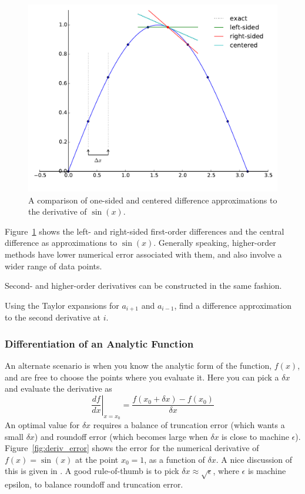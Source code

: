 \begin{figure}[t]
\centering
\includegraphics[width=0.8\linewidth]{derivs}
\caption[Difference approximations to the derivative of $\sin(x)$]
        {\label{fig:derivs} A comparison of one-sided and centered
          difference approximations to the derivative of $\sin(x)$.}
\end{figure}

Figure~\ref{fig:derivs} shows the left- and right-sided first-order
differences and the central difference as approximations to
$\sin(x)$. Generally speaking, higher-order methods have lower
numerical error associated with them, and also involve a wider range
of data points.

Second- and higher-order derivatives can be constructed in the same fashion.

\begin{exercise}
{Using the Taylor expansions for $a_{i+1}$ and $a_{i-1}$, find a difference
approximation to the second derivative at $i$.}
\end{exercise}

\subsubsection{Differentiation of an Analytic Function}

An alternate scenario is when you know the analytic form of the
function, $f(x)$, and are free to choose the points where you evaluate
it.  Here you can pick a $\delta x$ and evaluate the derivative as
\begin{equation}
\left . \frac{df}{dx} \right |_{x=x_0} =  \frac{f(x_0+\delta x) - f(x_0)}{\delta x}
\end{equation}
An optimal value for $\delta x$ requires a balance of truncation error
(which wants a small $\delta x$) and roundoff error (which becomes
large when $\delta x$ is close to machine $\epsilon$).
Figure~\ref{fig:deriv_error} shows the error for the numerical
derivative of $f(x) = \sin(x)$ at the point $x_0 = 1$, as a function
of $\delta x$.  A nice discussion of this is given in \cite{yak}.  A
good rule-of-thumb is to pick $\delta x \approx \sqrt{\epsilon}$,
where $\epsilon$ is machine epsilon, to balance roundoff and
truncation error.

